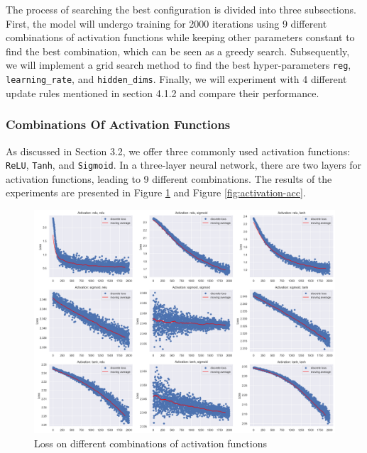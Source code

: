 \documentclass[10pt,a4paper,twoside]{tau}
\begin{document}
The process of searching the best configuration is divided into three subsections. First, the model will undergo training for 2000 iterations using 9 different combinations of activation functions while keeping other parameters constant to find the best combination, which can be seen as a greedy search. Subsequently, we will implement a grid search method to find the best hyper-parameters \texttt{reg}, \texttt{learning\_rate}, and \texttt{hidden\_dims}. Finally, we will experiment with 4 different update rules mentioned in section 4.1.2 and compare their performance.


\subsubsection{Combinations Of Activation Functions}

As discussed in Section 3.2, we offer three commonly used activation functions: \texttt{ReLU}, \texttt{Tanh}, and \texttt{Sigmoid}. In a three-layer neural network, there are two layers for activation functions, leading to 9 different combinations.  The results of the experiments are presented in Figure \ref{fig:activation-loss} and Figure \ref{fig:activation-acc}.


\begin{figure}[htbp]
    \centering
    \includegraphics[scale=0.21]{images/activation_loss.png}
    \caption{Loss on different combinations of activation functions}
    \label{fig:activation-loss}
\end{figure}
\end{document}
